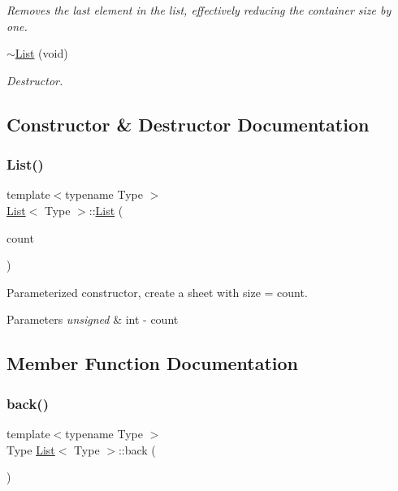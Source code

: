 \begin{DoxyCompactItemize}
\begin{DoxyCompactList}\small\item\em Removes the last element in the list, effectively reducing the container size by one. \end{DoxyCompactList}\item 
\mbox{\label{classList_a1d382eeeb6fddaa0de9714051700b305}} 
\hyperlink{classList_a1d382eeeb6fddaa0de9714051700b305}{$\sim$\+List} (void)
\begin{DoxyCompactList}\small\item\em Destructor. \end{DoxyCompactList}\end{DoxyCompactItemize}


\subsection{Constructor \& Destructor Documentation}
\mbox{\label{classList_add72f882a3484ed68b14b8c8c797a1f6}} 
\subsubsection{\texorpdfstring{List()}{List()}}
{\footnotesize\ttfamily template$<$typename Type $>$ \\
\hyperlink{classList}{List}$<$ Type $>$\+::\hyperlink{classList}{List} (\begin{DoxyParamCaption}\item[{unsigned int}]{count }\end{DoxyParamCaption})}



Parameterized constructor, create a sheet with size = count. 


\begin{DoxyParams}{Parameters}
{\em unsigned} & int -\/ count \\
\hline
\end{DoxyParams}


\subsection{Member Function Documentation}
\mbox{\label{classList_ab7b810c9f307470ccf357d0ba328f5b5}} 
\subsubsection{\texorpdfstring{back()}{back()}}
{\footnotesize\ttfamily template$<$typename Type $>$ \\
Type \hyperlink{classList}{List}$<$ Type $>$\+::back (\begin{DoxyParamCaption}\item[{void}]{ }\end{DoxyParamCaption})}


